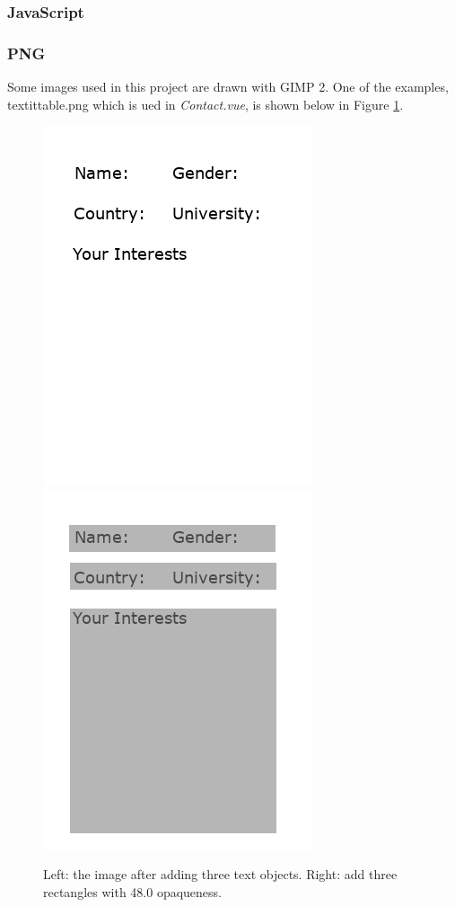\documentclass{article}
\begin{document}
\subsubsection{JavaScript}
\subsubsection{PNG}
Some images used in this project are drawn with GIMP 2. One of the examples,
textit{table.png} which is ued in \textit{Contact.vue}, is shown below in 
Figure \ref{fig: figure2}.

\begin{figure}[h]
    \centering
    \includegraphics{img/sectionPNG/table2.png}
    \includegraphics{img/sectionPNG/table1.png}
    \caption{Left: the image after adding three text objects. 
    Right: add three rectangles with 48.0 opaqueness.}
    \label{fig: figure2}
\end{figure}
\end{document}
